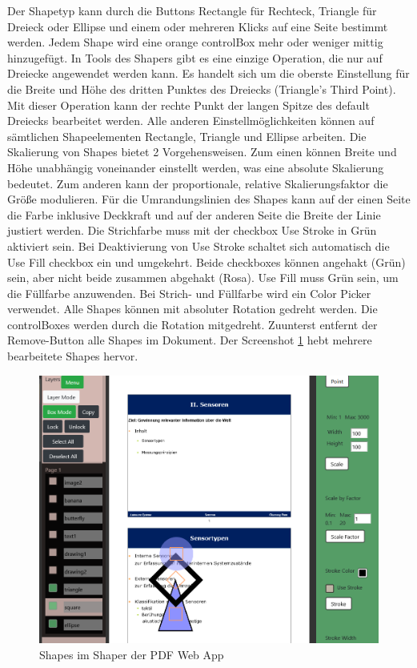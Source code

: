 Der Shapetyp kann durch die Buttons Rectangle für Rechteck, Triangle für Dreieck oder Ellipse und einem oder mehreren Klicks auf eine Seite bestimmt werden. Jedem Shape wird eine orange controlBox mehr oder weniger mittig hinzugefügt. In Tools des Shapers gibt es eine einzige Operation, die nur auf Dreiecke angewendet werden kann. Es handelt sich um die oberste Einstellung für die Breite und Höhe des dritten Punktes des Dreiecks (Triangle's Third Point). Mit dieser Operation kann der rechte Punkt der langen Spitze des default Dreiecks bearbeitet werden. Alle anderen Einstellmöglichkeiten können auf sämtlichen Shapeelementen Rectangle, Triangle und Ellipse arbeiten. Die Skalierung von Shapes bietet 2 Vorgehensweisen. Zum einen können Breite und Höhe unabhängig voneinander einstellt werden, was eine absolute Skalierung bedeutet. Zum anderen kann der proportionale, relative Skalierungsfaktor die Größe modulieren. Für die Umrandungslinien des Shapes kann auf der einen Seite die Farbe inklusive Deckkraft und auf der anderen Seite die Breite der Linie justiert werden. Die Strichfarbe muss mit der checkbox Use Stroke in Grün aktiviert sein. Bei Deaktivierung von Use Stroke schaltet sich automatisch die Use Fill checkbox ein und umgekehrt. Beide checkboxes können angehakt (Grün) sein, aber nicht beide zusammen abgehakt (Rosa). Use Fill muss Grün sein, um die Füllfarbe anzuwenden. Bei Strich- und Füllfarbe wird ein Color Picker verwendet. Alle Shapes können mit absoluter Rotation gedreht werden. Die controlBoxes werden durch die Rotation mitgedreht. Zuunterst entfernt der Remove-Button alle Shapes im Dokument. Der Screenshot \ref{fig:shaping} hebt mehrere bearbeitete Shapes hervor.

\begin{figure}[!htbp]
	\centering
	\includegraphics[width=1\textwidth]{"images/shaping.png"}
	\caption{Shapes im Shaper der PDF Web App}
	\label{fig:shaping}
\end{figure}


